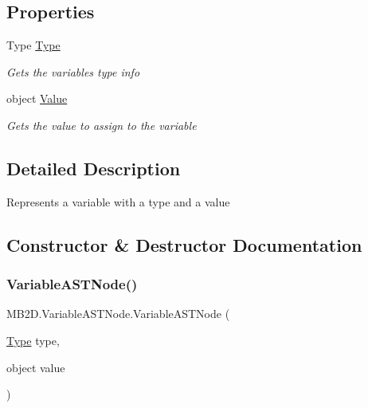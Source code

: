 \subsection*{Properties}
\begin{DoxyCompactItemize}
\item 
Type \hyperlink{class_m_b2_d_1_1_variable_a_s_t_node_a32549a5361b7664b945b4d9537a5b454}{Type}
\begin{DoxyCompactList}\small\item\em Gets the variables type info \end{DoxyCompactList}\item 
object \hyperlink{class_m_b2_d_1_1_variable_a_s_t_node_ac96eab1a60b3cfab45a718ff87473a4f}{Value}
\begin{DoxyCompactList}\small\item\em Gets the value to assign to the variable \end{DoxyCompactList}\end{DoxyCompactItemize}


\subsection{Detailed Description}
Represents a variable with a type and a value 



\subsection{Constructor \& Destructor Documentation}
\hypertarget{class_m_b2_d_1_1_variable_a_s_t_node_a60c81f23a47577aefc76ecb9dc18d40f}{}\label{class_m_b2_d_1_1_variable_a_s_t_node_a60c81f23a47577aefc76ecb9dc18d40f} 
\subsubsection{\texorpdfstring{Variable\+A\+S\+T\+Node()}{VariableASTNode()}}
{\footnotesize\ttfamily M\+B2\+D.\+Variable\+A\+S\+T\+Node.\+Variable\+A\+S\+T\+Node (\begin{DoxyParamCaption}\item[{\hyperlink{class_m_b2_d_1_1_variable_a_s_t_node_a32549a5361b7664b945b4d9537a5b454}{Type}}]{type,  }\item[{object}]{value }\end{DoxyParamCaption})\hspace{0.3cm}{\ttfamily [inline]}}



